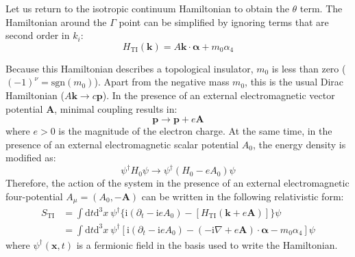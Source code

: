 Let us return to the isotropic continuum Hamiltonian to obtain the $\theta$ term. The Hamiltonian around the $\Gamma$ point can be simplified by ignoring terms that are second order in $k_i$:
\begin{equation}
H_{\mathrm{TI}}(\bm{k}) = A \bm{k} \cdot \bm{\alpha} + m_0 \alpha_4
\end{equation}

Because this Hamiltonian describes a topological insulator, $m_0$ is less than zero
($(-1)^\nu = \mathrm{sgn}(m_0)$). 
Apart from the negative mass $m_0$, this is the usual Dirac Hamiltonian ($A\bm{k} \to c\bm{p}$).
In the presence of an external electromagnetic vector potential $\bm{A}$, minimal coupling results in:
\begin{equation}
\bm{p} \to \bm{p} + e\bm{A}
\end{equation}
where $e>0$ is the magnitude of the electron charge.
At the same time, in the presence of an external electromagnetic scalar potential $A_0$, the energy density is modified as:
\begin{equation}
\psi^\dagger H_0 \psi \to \psi^\dagger (H_0 - eA_0) \psi
\end{equation}
Therefore, the action of the system in the presence of an external electromagnetic four-potential $A_\mu = (A_0, -\bm{A})$ can be written in the following relativistic form:
\begin{equation}
\begin{aligned}
S_{\mathrm{TI}} &= \int \mathrm{d}t \mathrm{d}^3x \ \psi^\dagger \{ \mathrm{i}(\partial_t - \mathrm{i}eA_0) - [H_{\mathrm{TI}}(\bm{k} + e\bm{A})] \} \psi \\
&= \int \mathrm{d}t \mathrm{d}^3x \ \psi^\dagger [ \mathrm{i}(\partial_t - \mathrm{i}eA_0) - (-\mathrm{i}\nabla + e\bm{A}) \cdot \bm{\alpha} - m_0 \alpha_4 ] \psi
\end{aligned}
\end{equation}
where $\psi^\dagger(\bm{x},t)$ is a fermionic field in the basis used to write the Hamiltonian.

